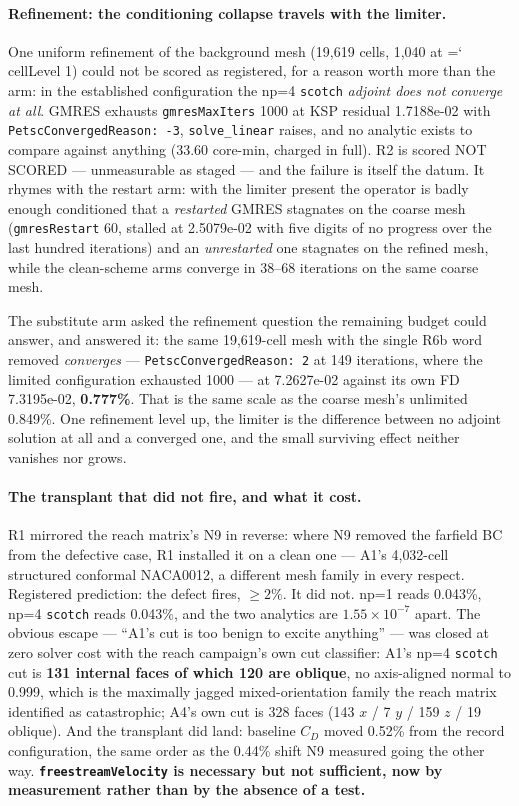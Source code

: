 \documentclass[11pt,a4paper]{article}
\newcommand{\artifact}[1]{{\small\ttfamily\hyphenchar\font=`\-\relax
  \def\_{\textunderscore\allowbreak}#1}}
\begin{document}
\paragraph{Refinement: the conditioning collapse travels with the limiter.} One uniform
refinement of the background mesh (19{,}619 cells, 1{,}040 at \artifact{cellLevel} 1) could
not be scored as registered, for a reason worth more than the arm: in the established
configuration the np=4 \texttt{scotch} \emph{adjoint does not converge at all}. GMRES exhausts
\texttt{gmresMaxIters} 1000 at KSP residual 1.7188e-02 with \texttt{PetscConvergedReason: -3},
\texttt{solve\_linear} raises, and no analytic exists to compare against anything (33.60
core-min, charged in full). R2 is scored NOT SCORED --- unmeasurable as staged --- and the
failure is itself the datum. It rhymes with the restart arm: with the limiter present the
operator is badly enough conditioned that a \emph{restarted} GMRES stagnates on the coarse
mesh (\texttt{gmresRestart} 60, stalled at 2.5079e-02 with five digits of no progress over
the last hundred iterations) and an \emph{unrestarted} one stagnates on the refined mesh,
while the clean-scheme arms converge in 38--68 iterations on the same coarse mesh.

The substitute arm asked the refinement question the remaining budget could answer, and
answered it: the same 19{,}619-cell mesh with the single R6b word removed \emph{converges} ---
\texttt{PetscConvergedReason: 2} at 149 iterations, where the limited configuration exhausted
1000 --- at 7.2627e-02 against its own FD 7.3195e-02, \textbf{0.777\%}. That is the same scale
as the coarse mesh's unlimited 0.849\%. One refinement level up, the limiter is the difference
between no adjoint solution at all and a converged one, and the small surviving effect neither
vanishes nor grows.

\paragraph{The transplant that did not fire, and what it cost.} R1 mirrored the reach
matrix's N9 in reverse: where N9 removed the farfield BC from the defective case, R1
installed it on a clean one --- A1's 4{,}032-cell structured conformal NACA0012, a different
mesh family in every respect. Registered prediction: the defect fires, \(\ge 2\%\). It did
not. np=1 reads 0.043\%, np=4 \texttt{scotch} reads 0.043\%, and the two analytics are
\(1.55\times10^{-7}\) apart. The obvious escape --- ``A1's cut is too benign to excite
anything'' --- was closed at zero solver cost with the reach campaign's own cut classifier:
A1's np=4 \texttt{scotch} cut is \textbf{131 internal faces of which 120 are oblique}, no
axis-aligned normal to 0.999, which is the maximally jagged mixed-orientation family the
reach matrix identified as catastrophic; A4's own cut is 328 faces (143 \(x\) / 7 \(y\) /
159 \(z\) / 19 oblique). And the transplant did land: baseline \(C_D\) moved 0.52\% from the
record configuration, the same order as the 0.44\% shift N9 measured going the other way.
\textbf{\texttt{freestreamVelocity} is necessary but not sufficient, now by measurement
rather than by the absence of a test.}
\end{document}
